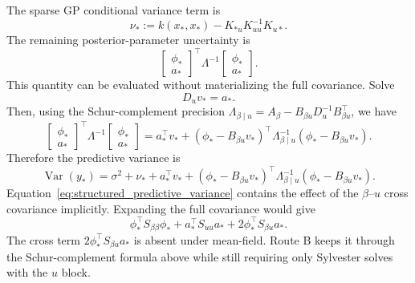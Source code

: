 \documentclass[12pt]{article}
\newcommand{\Var}{\operatorname{Var}}
\begin{document}
The sparse GP conditional variance term is
\begin{equation}
    \nu_*
    :=
    k(x_*,x_*)-K_{*u}K_{uu}^{-1}K_{u*}.
\end{equation}
The remaining posterior-parameter uncertainty is
\begin{equation}
    \begin{bmatrix}\phi_*\\a_*\end{bmatrix}^{\!\top}
    \Lambda^{-1}
    \begin{bmatrix}\phi_*\\a_*\end{bmatrix}.
\end{equation}
This quantity can be evaluated without materializing the full covariance. Solve
\begin{equation}
    D_uv_*=a_*.
\end{equation}
Then, using the Schur-complement precision
$\Lambda_{\beta\mid u}=A_\beta-B_{\beta u}D_u^{-1}B_{\beta u}^\top$, we have
\begin{equation}
    \begin{bmatrix}\phi_*\\a_*\end{bmatrix}^{\!\top}
    \Lambda^{-1}
    \begin{bmatrix}\phi_*\\a_*\end{bmatrix}
    =
    a_*^\top v_*
    +
    \left(\phi_*-B_{\beta u}v_*\right)^\top
    \Lambda_{\beta\mid u}^{-1}
    \left(\phi_*-B_{\beta u}v_*\right).
    \label{eq:structured_predictive_quadratic}
\end{equation}
Therefore the predictive variance is
\begin{equation}
    \Var(y_*)
    =
    \sigma^2+
    \nu_*+
    a_*^\top v_*
    +
    \left(\phi_*-B_{\beta u}v_*\right)^\top
    \Lambda_{\beta\mid u}^{-1}
    \left(\phi_*-B_{\beta u}v_*\right).
    \label{eq:structured_predictive_variance}
\end{equation}
Equation~\eqref{eq:structured_predictive_variance} contains the effect of the
$\beta$--$u$ cross covariance implicitly. Expanding the full covariance would give
\begin{equation}
    \phi_*^\top S_{\beta\beta}\phi_*
    +a_*^\top S_{uu}a_*
    +2\phi_*^\top S_{\beta u}a_*.
\end{equation}
The cross term $2\phi_*^\top S_{\beta u}a_*$ is absent under mean-field. Route B keeps
it through the Schur-complement formula above while still requiring only Sylvester solves
with the $u$ block.
\end{document}
